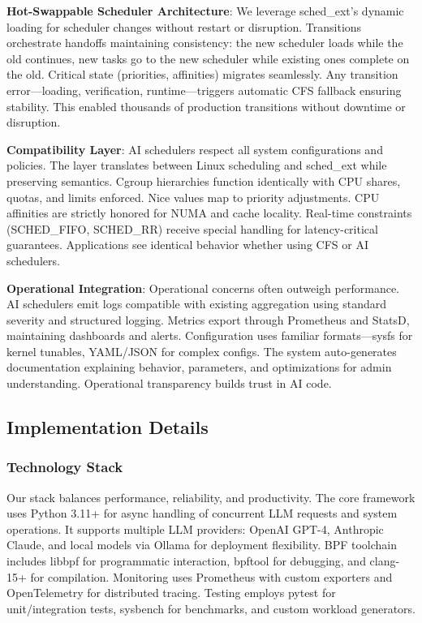 \textbf{Hot-Swappable Scheduler Architecture}: We leverage sched\_ext's dynamic loading for scheduler changes without restart or disruption. Transitions orchestrate handoffs maintaining consistency: the new scheduler loads while the old continues, new tasks go to the new scheduler while existing ones complete on the old. Critical state (priorities, affinities) migrates seamlessly. Any transition error—loading, verification, runtime—triggers automatic CFS fallback ensuring stability. This enabled thousands of production transitions without downtime or disruption.

\textbf{Compatibility Layer}: AI schedulers respect all system configurations and policies. The layer translates between Linux scheduling and sched\_ext while preserving semantics. Cgroup hierarchies function identically with CPU shares, quotas, and limits enforced. Nice values map to priority adjustments. CPU affinities are strictly honored for NUMA and cache locality. Real-time constraints (SCHED\_FIFO, SCHED\_RR) receive special handling for latency-critical guarantees. Applications see identical behavior whether using CFS or AI schedulers.

\textbf{Operational Integration}: Operational concerns often outweigh performance. AI schedulers emit logs compatible with existing aggregation using standard severity and structured logging. Metrics export through Prometheus and StatsD, maintaining dashboards and alerts. Configuration uses familiar formats—sysfs for kernel tunables, YAML/JSON for complex configs. The system auto-generates documentation explaining behavior, parameters, and optimizations for admin understanding. Operational transparency builds trust in AI code.

\subsection{Implementation Details}

\subsubsection{Technology Stack}
Our stack balances performance, reliability, and productivity. The core framework uses Python 3.11+ for async handling of concurrent LLM requests and system operations. It supports multiple LLM providers: OpenAI GPT-4, Anthropic Claude, and local models via Ollama for deployment flexibility. BPF toolchain includes libbpf for programmatic interaction, bpftool for debugging, and clang-15+ for compilation. Monitoring uses Prometheus with custom exporters and OpenTelemetry for distributed tracing. Testing employs pytest for unit/integration tests, sysbench for benchmarks, and custom workload generators.


